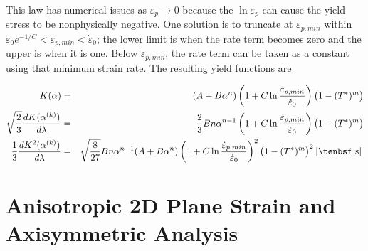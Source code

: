 \documentclass[11pt]{book}
\def\dev{\hbox{\tenbsf s}}
\begin{document}
\noindent This law has numerical issues as $\dot{\varepsilon}_p\to 0$ because the $\ln \dot{\varepsilon}_p$ can cause the yield stress to be nonphysically negative. One solution is to truncate at $\dot{\varepsilon}_{p,min}$ within $\dot{\varepsilon}_0 e^{-1/C} < \dot{\varepsilon}_{p,min} < \dot{\varepsilon}_0$; the lower limit is when the rate term becomes zero and the upper is when it is one. Below $\dot{\varepsilon}_{p,min}$, the rate term can be taken as a constant using that minimum strain rate. The resulting yield functions are

\begin{eqnarray}
   K(\alpha) & = &  (A+B\alpha^n)\left(1+C\ln{\dot{\varepsilon}_{p,min}\over \dot{\varepsilon}_0}\right)\bigl(1-(T^*)^m\bigr) \\
   \sqrt{2\over3}{dK(\alpha^{(k)})\over d\lambda} & = &  {2\over 3} B n \alpha^{n-1}\left(1+C\ln{\dot{\varepsilon}_{p,min}\over \dot{\varepsilon}_0}\right)
                   \bigl(1-(T^*)^m\bigr)\\
   {1\over3}{dK^2(\alpha^{(k)})\over d\lambda} & = & \sqrt{8\over27}B n \alpha^{n-1}(A+B\alpha^n)\left(1+C\ln{\dot{\varepsilon}_{p,min}\over \dot{\varepsilon}_0}\right)^2
                   \bigl(1-(T^*)^m\bigr)^2   \|\dev\|
\end{eqnarray}

\section{Anisotropic 2D Plane Strain and Axisymmetric Analysis}
\end{document}
